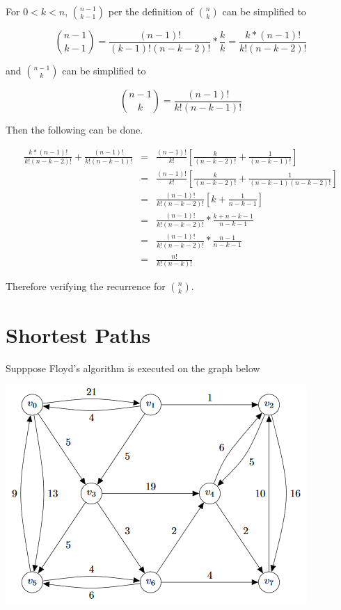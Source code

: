 \documentclass[11pt]{article}
\begin{document}
\bigskip
\bigskip
\bigskip

For $0<k<n$, $\binom{n-1}{k-1}$ per the definition of $\binom{n}{k}$ can be simplified to 

\begin{equation*}
\binom{n-1}{k-1} = \frac{(n-1)!}{(k-1)!(n-k-2)!} * \frac{k}{k} =  \frac{k*(n-1)!}{k!(n-k-2)!}
\end{equation*}

and $\binom{n-1}{k}$ can be simplified to

\begin{equation*}
\binom{n-1}{k} = \frac{(n-1)!}{k!(n-k-1)!}
\end{equation*}

\bigskip
\bigskip
\bigskip

\noindent Then the following can be done.

\begin{eqnarray*}
\frac{k*(n-1)!}{k!(n-k-2)!} + \frac{(n-1)!}{k!(n-k-1)!} &=& \frac{(n-1)!}{k!} \left [ \frac{k}{(n-k-2)!} + \frac{1}{(n-k-1)!} \right ] \\
	&=& \frac{(n-1)!}{k!} \left [ \frac{k}{(n-k-2)!} + \frac{1}{(n-k-1)(n-k-2)!} \right ] \\
	&=& \frac{(n-1)!}{k!(n-k-2)!} \left [ k + \frac{1}{n-k-1} \right ] \\
	&=& \frac{(n-1)!}{k!(n-k-2)!}* \frac{k+n-k-1}{n-k-1} \\
	&=& \frac{(n-1)!}{k!(n-k-2)!}* \frac{n-1}{n-k-1} \\
	&=& \frac{n!}{k!(n-k)!}
\end{eqnarray*}

Therefore verifying the recurrence for $\binom{n}{k}$.


\section{Shortest Paths}
Supppose Floyd's algorithm is executed on the graph below

\includegraphics{WeightedGraph.png}
\end{document}
